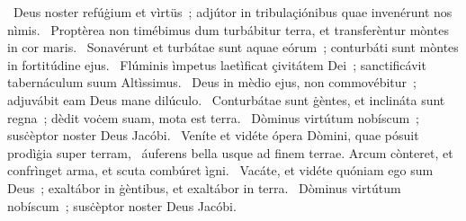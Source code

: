 ~Deus noster refúġium et vìrtüs~; adjútor in tribulaçiónibus quae invenérunt nos nìmis. 
~Proptèrea non timébimus dum turbábitur terra, et transferèntur mòntes in cor maris. 
~Sonavérunt et turbátae sunt aquae eórum~; conturbáti sunt mòntes in fortitúdine ejus. 
~Flúminis ìmpetus laetìficat çivitátem Dei~; sanctificávit tabernáculum suum Altìssimus. 
~Deus in mèdio ejus, non commovébitur~; adjuvábit eam Deus mane dilúculo. 
~Conturbátae sunt ġèntes, et inclináta sunt regna~; dèdit voċem suam, mota est terra. 
~Dòminus virtútum nobíscum~; susċèptor noster Deus Jacóbi. 
~Veníte et vidéte ópera Dòmini, quae pósuit prodìġia super terram, 
~áuferens bella usque ad finem terrae. Arcum cònteret, et confrìnget arma, et scuta combúret ìgni. 
~Vacáte, et vidéte quóniam ego sum Deus~; exaltábor in ġèntibus, et exaltábor in terra. 
~Dòminus virtútum nobíscum~; susċèptor noster Deus Jacóbi. 
